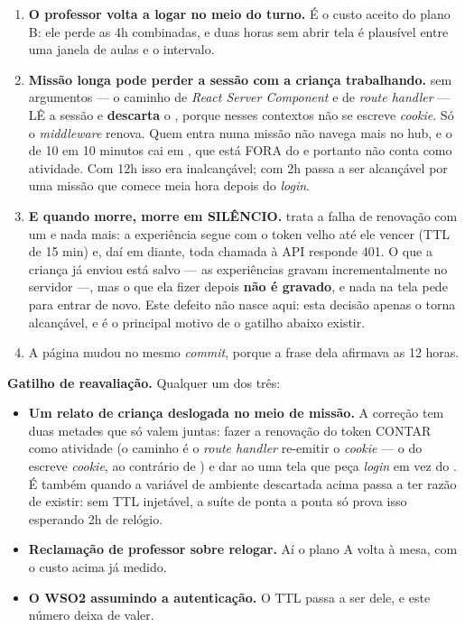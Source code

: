 \begin{enumerate}
  \item \textbf{O professor volta a logar no meio do turno.} É o custo aceito do
    plano B: ele perde as 4h combinadas, e duas horas sem abrir tela é plausível
    entre uma janela de aulas e o intervalo.
  \item \textbf{Missão longa pode perder a sessão com a criança trabalhando.}
     sem argumentos --- o caminho de \emph{React Server Component} e
    de \emph{route handler} --- LÊ a sessão e \textbf{descarta} o
    , porque nesses contextos não se escreve \emph{cookie}. Só o
    \emph{middleware} renova. Quem entra numa missão não navega mais no hub, e o
     de 10 em 10 minutos cai em
    , que está FORA do  e portanto não
    conta como atividade. Com 12h isso era inalcançável; com 2h passa a ser
    alcançável por uma missão que comece meia hora depois do \emph{login}.
  \item \textbf{E quando morre, morre em SILÊNCIO.}
     trata a falha de renovação com um
     e nada mais: a experiência segue com o token velho até
    ele vencer (TTL de 15 min) e, daí em diante, toda chamada à API responde
    401. O que a criança já enviou está salvo --- as experiências gravam
    incrementalmente no servidor ---, mas o que ela fizer depois \textbf{não é
    gravado}, e nada na tela pede para entrar de novo. Este defeito não nasce
    aqui: esta decisão apenas o torna alcançável, e é o principal motivo de o
    gatilho abaixo existir.
  \item A página  mudou no mesmo \emph{commit}, porque a
    frase dela afirmava as 12 horas.
\end{enumerate}

\textbf{Gatilho de reavaliação.} Qualquer um dos três:
\begin{itemize}
  \item \textbf{Um relato de criança deslogada no meio de missão.} A correção
    tem duas metades que só valem juntas: fazer a renovação do token CONTAR como
    atividade (o caminho é o \emph{route handler} re-emitir o \emph{cookie} ---
    o  do  escreve \emph{cookie}, ao
    contrário de ) e dar ao  uma tela que peça
    \emph{login} em vez do . É também quando a variável de
    ambiente descartada acima passa a ter razão de existir: sem TTL injetável, a
    suíte de ponta a ponta só prova isso esperando 2h de relógio.
  \item \textbf{Reclamação de professor sobre relogar.} Aí o plano A volta à
    mesa, com o custo acima já medido.
  \item \textbf{O WSO2 assumindo a autenticação.} O TTL passa a ser dele, e este
    número deixa de valer.
\end{itemize}

